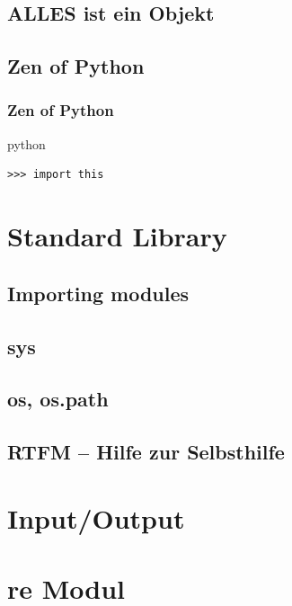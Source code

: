 \documentclass{beamer}
\begin{document}
\subsection{ALLES ist ein Objekt}
\subsection{Zen of Python} 
\begin{frame}[fragile]
    \frametitle{Zen of Python}

    \begin{exampleblock}{python}
    \begin{lstlisting}
>>> import this
    \end{lstlisting}
    \end{exampleblock}
\end{frame}

\section{Standard Library}
\subsection{Importing modules}
\subsection{sys} 
\subsection{os, os.path} 
\subsection{RTFM -- Hilfe zur Selbsthilfe}  

\section{Input/Output } 

\section{re Modul}
\end{document}
